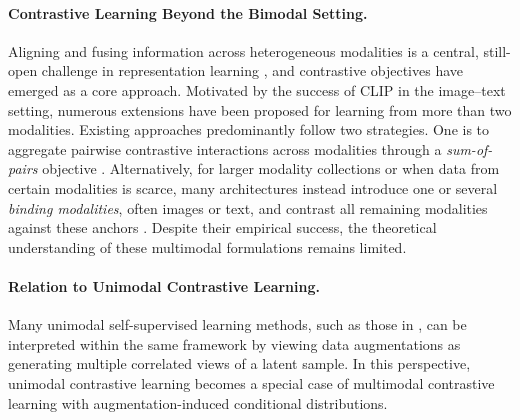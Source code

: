 \documentclass{article}
\begin{document}
\paragraph{Contrastive Learning Beyond the Bimodal Setting.}
Aligning and fusing information across heterogeneous modalities is a
central, still-open challenge in representation learning
\citep{yuanSurveyMultimodalLearning2025, liMultimodalAlignmentFusion2026},
and contrastive objectives have emerged as a core approach. Motivated by
the success of CLIP in the image--text setting, numerous extensions have
been proposed for learning from more than two modalities. Existing
approaches predominantly follow two strategies. One is to aggregate
pairwise contrastive interactions across modalities through a
\emph{sum-of-pairs} objective \citep{tianContrastiveMultiviewCoding2020a,
 portillo-quinteroStraightforwardFrameworkVideo2021a,
 luoCLIP4ClipEmpiricalStudy2022, guzhovAudioclipExtendingClip2022,
 nagraniLearningAudioVideoModalities2022, tevetMotionCLIPExposingHuman2022,
 zhuBringingMultimodalityAmazon2024, zhouTENTConnectLanguage2026}.
Alternatively, for larger modality collections or when data from certain
modalities is scarce, many architectures instead introduce one or several
\emph{binding modalities}, often images or text, and contrast all remaining
modalities against these anchors \citep{girdharImageBindOneEmbedding2023,
 luATokenUnifiedTokenizer2025}. Despite their empirical success, the
theoretical understanding of these multimodal formulations remains limited.

\paragraph{Relation to Unimodal Contrastive Learning.}
Many unimodal self-supervised learning methods, such as those in
\citep{heMomentumContrastUnsupervised2020a,
 chenSimpleFrameworkContrastive2020, chenBigSelfsupervisedModels2020,
 grillBootstrapYourOwn2020}, can be interpreted within the same framework by
viewing data augmentations as generating multiple correlated views of a
latent sample. In this perspective, unimodal contrastive learning becomes a
special case of multimodal contrastive learning with augmentation-induced
conditional distributions.
\end{document}

